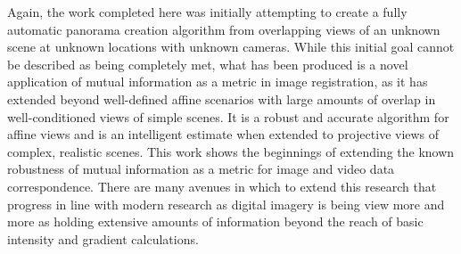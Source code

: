 %
%
%
%
%
%
%
%
%

%
%
%



Again, the work completed here was initially attempting to create a fully automatic panorama creation algorithm from overlapping views of an unknown scene at unknown locations with unknown cameras. While this initial goal cannot be described as being completely met, what has been produced is a novel application of mutual information as a metric in image registration, as it has extended beyond well-defined affine scenarios with large amounts of overlap in well-conditioned views of simple scenes. It is a robust and accurate algorithm for affine views and is an intelligent estimate when extended to projective views of complex, realistic scenes. This work shows the beginnings of extending the known robustness of mutual information as a metric for image and video data correspondence. There are many avenues in which to extend this research that progress in line with modern research as digital imagery is being view more and more as holding extensive amounts of information beyond the reach of basic intensity and gradient calculations.


